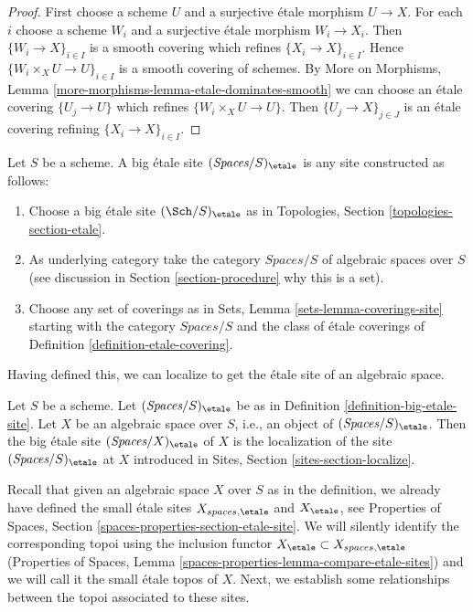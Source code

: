 \begin{proof}
First choose a scheme $U$ and a surjective \'etale morphism $U \to X$.
For each $i$ choose a scheme $W_i$ and a surjective \'etale morphism
$W_i \to X_i$. Then $\{W_i \to X\}_{i \in I}$ is a smooth covering
which refines $\{X_i \to X\}_{i \in I}$. Hence
$\{W_i \times_X U \to U\}_{i \in I}$ is a smooth covering of schemes.
By More on Morphisms, Lemma \ref{more-morphisms-lemma-etale-dominates-smooth}
we can choose an \'etale covering $\{U_j \to U\}$ which refines
$\{W_i \times_X U \to U\}$. Then $\{U_j \to X\}_{j \in J}$
is an \'etale covering refining $\{X_i \to X\}_{i \in I}$.
\end{proof}

\begin{definition}
\label{definition-big-etale-site}
Let $S$ be a scheme. A big \'etale site {\it $(\textit{Spaces}/S)_\etale$}
is any site constructed as follows:
\begin{enumerate}
\item Choose a big \'etale site $(\Sch/S)_\etale$ as in
Topologies, Section \ref{topologies-section-etale}.
\item As underlying category take the category $\textit{Spaces}/S$
of algebraic spaces over $S$ (see discussion in
Section \ref{section-procedure} why this is a set).
\item Choose any set of coverings as in
Sets, Lemma \ref{sets-lemma-coverings-site} starting with the
category $\textit{Spaces}/S$ and the class of \'etale coverings
of Definition \ref{definition-etale-covering}.
\end{enumerate}
\end{definition}

\noindent
Having defined this, we can localize to get the \'etale
site of an algebraic space.

\begin{definition}
\label{definition-big-small-etale}
Let $S$ be a scheme. Let $(\textit{Spaces}/S)_\etale$ be as in
Definition \ref{definition-big-etale-site}.
Let $X$ be an algebraic space over $S$, i.e., an object of
$(\textit{Spaces}/S)_\etale$. Then the big \'etale site
{\it $(\textit{Spaces}/X)_\etale$} of $X$
is the localization of the site $(\textit{Spaces}/S)_\etale$
at $X$ introduced in Sites, Section \ref{sites-section-localize}.
\end{definition}

\noindent
Recall that given an algebraic space $X$ over $S$ as in
the definition, we already have defined the small \'etale sites
$X_{spaces, \etale}$ and $X_\etale$, see
Properties of Spaces, Section \ref{spaces-properties-section-etale-site}.
We will silently identify the corresponding topoi using
the inclusion functor $X_\etale \subset X_{spaces, \etale}$
(Properties of Spaces, Lemma \ref{spaces-properties-lemma-compare-etale-sites})
and we will call it the small \'etale topos of $X$.
Next, we establish some relationships between the topoi
associated to these sites.

